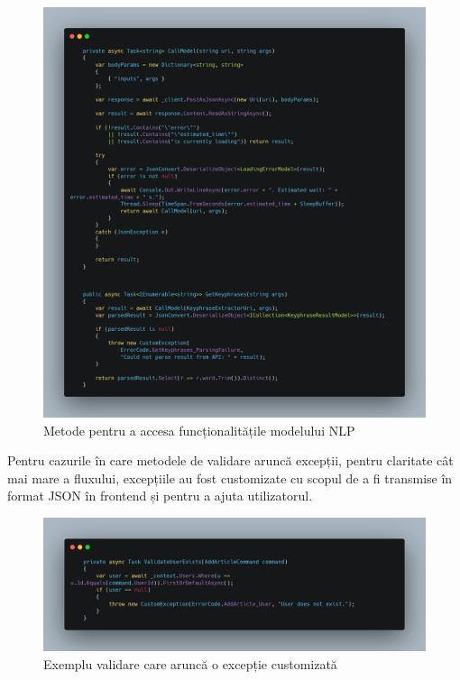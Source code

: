 \begin{figure}[ht]
	\centering
	\includegraphics[width=150mm]{figs/huggingFaceHelper.png}
	\caption{Metode pentru a accesa funcționalitățile modelului NLP}
	\label{fig:huggingFaceHelper}
\end{figure}

Pentru cazurile în care metodele de validare aruncă excepții, pentru claritate cât mai mare a fluxului, excepțiile au fost customizate cu scopul de a fi transmise în format JSON în frontend și pentru a ajuta utilizatorul.
\begin{figure}[H]
	\centering
	\includegraphics[width=150mm]{figs/customException.png}
	\caption{Exemplu validare care aruncă o excepție customizată}
	\label{fig:customException}
\end{figure}

